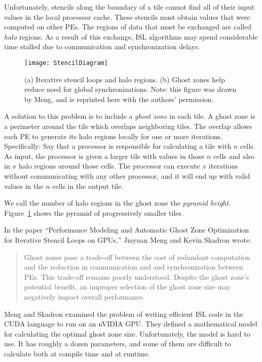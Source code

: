 \documentclass{styles/sig-alternate}
\begin{document}
Unfortunately, stencils along the boundary of a tile cannot find all
of their input values in the local processor cache.  These stencils
must obtain values that were computed on other PEs.  The regions of
data that must be exchanged are called {\em halo} regions.  As a
result of this exchange, ISL algorithms may spend considerable time
stalled due to communication and synchronization delays.

\begin{figure}
\texttt{[image: StencilDiagram]}
\caption{(a) Iterative stencil loops and halo regions.  (b) Ghost zones help
reduce need for global synchronizations.  Note: this figure was drawn by Meng, 
and is reprinted here with the authors' permission.}
\label{fig:trapezoid}
\end{figure}

A solution to this problem is to include a {\em ghost zone} in each
tile.  A ghost zone is a perimeter around the tile which overlaps
neighboring tiles.  The overlap allows each PE to generate its halo
regions locally for one or more iterations.  Specifically: Say that a
processor is responsible for calculating a tile with $n$ cells.  As
input, the processor is given a larger tile with values in those $n$
cells and also in $x$ halo regions around those cells.  The processor
can execute $x$ iterations without communicating with any other
processor, and it will end up with valid values in the $n$ cells in
the output tile.

We call the number of halo regions in the ghost zone the {\em pyramid
  height}.  Figure~\ref{fig:trapezoid} shows the pyramid of
progressively smaller tiles.

In the paper ``Performance Modeling and Automatic Ghost Zone
Optimization for Iterative Stencil Loops on GPUs,'' \cite{meng}
Jiayuan Meng and Kevin Skadron wrote:

\begin{quote}
Ghost zones pose a trade-off between the cost of redundant computation
and the reduction in communication and and synchronization between
PEs.  This trade-off remains poorly understood.  Despite the ghost
zone's potential benefit, an improper selection of the ghost zone size
may negatively impact overall performance.
\end{quote}

Meng and Skadron examined the problem of writing efficient ISL code in
the CUDA language to run on an nVIDIA GPU.  They defined a mathematical
model for calculating the optimal ghost zone size.  Unfortunately, the
model is hard to use.  It has roughly a dozen parameters, and some of
them are difficult to calculate both at compile time and at runtime.
\end{document}
